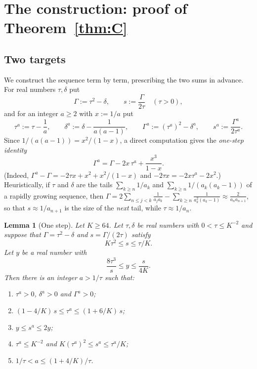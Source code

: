 \documentclass[11pt]{amsart}
\newtheorem{lemma}{Lemma}[section]
\theoremstyle{definition}
\theoremstyle{remark}
\begin{document}
\section{The construction: proof of Theorem~\ref{thm:C}}\label{sec:C}

\subsection{Two targets}
We construct the sequence term by term, prescribing the two sums in advance. For real
numbers $\tau,\delta$ put
\[
\Gamma:=\tau^2-\delta,\qquad s:=\frac{\Gamma}{2\tau}\quad(\tau>0),
\]
and for an integer $a\ge2$ with $x:=1/a$ put
\[
\tau^{a}:=\tau-\frac1a,\qquad \delta^{a}:=\delta-\frac1{a(a-1)},\qquad
\Gamma^{a}:=(\tau^{a})^2-\delta^{a},\qquad s^{a}:=\frac{\Gamma^{a}}{2\tau^{a}} .
\]
Since $1/(a(a-1))=x^2/(1-x)$, a direct computation gives the \emph{one-step identity}
\begin{equation}\label{eq:onestep}
\Gamma^{a}=\Gamma-2x\,\tau^{a}+\frac{x^3}{1-x}.
\end{equation}
(Indeed, $\Gamma^a-\Gamma=-2\tau x+x^2+x^2/(1-x)$ and $-2\tau x=-2x\tau^a-2x^2$.)
Heuristically, if $\tau$ and $\delta$ are the tails $\sum_{k\ge n}1/a_k$ and
$\sum_{k\ge n}1/(a_k(a_k-1))$ of a rapidly growing sequence, then
$\Gamma=2\sum_{n\le j<k}\frac1{a_ja_k}-\sum_{k\ge n}\frac{1}{a_k^2(a_k-1)}\approx
\frac{2}{a_na_{n+1}}$, so that $s\approx 1/a_{n+1}$ is the size of the \emph{next}
tail, while $\tau\approx1/a_n$.

\begin{lemma}[One step]\label{lem:step}
Let $K\ge64$. Let $\tau,\delta$ be real numbers with $0<\tau\le K^{-2}$ and suppose that
$\Gamma=\tau^2-\delta$ and $s=\Gamma/(2\tau)$ satisfy
\begin{equation}\label{eq:inv}
K\tau^2\le s\le \tau/K .
\end{equation}
Let $y$ be a real number with
\begin{equation}\label{eq:ychoice}
\frac{8\tau^3}{s}\le y\le\frac{s}{4K}.
\end{equation}
Then there is an integer $a>1/\tau$ such that:
\begin{enumerate}[label=\textup{(\alph*)}]
\item $\tau^a>0$, $\delta^a>0$ and $\Gamma^a>0$;
\item $(1-4/K)\,s\le\tau^a\le(1+6/K)\,s$;
\item $y\le s^a\le 2y$;
\item $\tau^a\le K^{-2}$ and $K(\tau^a)^2\le s^a\le\tau^a/K$;
\item $1/\tau<a\le(1+4/K)/\tau$.
\end{enumerate}
\end{lemma}
\end{document}
